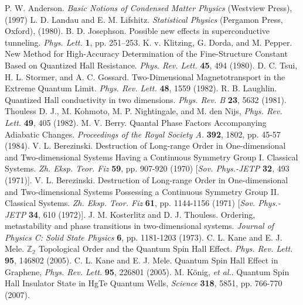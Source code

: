 \documentclass[titlepage,a4paper]{book}
\begin{document}
\begin{thebibliography}{199}
P. W. Anderson. \textit{Basic Notions of Condensed Matter Physics} (Westview Press), (1997)
L. D. Landau and E. M. Lifshitz. \textit{Statistical Physics} (Pergamon Press, Oxford), (1980).
B. D. Josephson. Possible new effects in superconductive tunneling. \textit{Phys. Lett.} \textbf{1}, pp. 251–253. 
K. v. Klitzing, G. Dorda, and M. Pepper. New Method for High-Accuracy Determination of the Fine-Structure Constant Based on Quantized Hall Resistance. \textit{Phys. Rev. Lett.} \textbf{45}, 494 (1980).
D. C. Tsui, H. L. Stormer, and A. C. Gossard. Two-Dimensional Magnetotransport in the Extreme Quantum Limit. \textit{Phys. Rev. Lett.} \textbf{48}, 1559 (1982).
R. B. Laughlin. Quantized Hall conductivity in two dimensions. \textit{Phys. Rev. B} \textbf{23}, 5632 (1981).
Thouless D. J., M. Kohmoto, M. P. Nightingale, and M. den Nijs, \textit{Phys. Rev. Lett.} \textbf{49}, 405 (1982).
M. V. Berry. Quantal Phase Factors Accompanying Adiabatic Changes. \textit{Proceedings of the Royal Society A.} \textbf{392}, 1802, pp. 45-57 (1984).
V. L. Berezinski. Destruction of Long-range Order in One-dimensional and Two-dimensional Systems Having a Continuous Symmetry Group I. Classical Systems. \textit{Zh. Eksp. Teor. Fiz} \textbf{59}, pp. 907-920 (1970) [\textit{Sov. Phys.-JETP} \textbf{32}, 493 (1971)].
V. L. Berezinski. Destruction of Long-range Order in One-dimensional and Two-dimensional Systems Possessing a Continuous Symmetry Group II. Classical Systems. \textit{Zh. Eksp. Teor. Fiz} \textbf{61}, pp. 1144-1156 (1971) [\textit{Sov. Phys.-JETP} \textbf{34}, 610 (1972)].
J. M. Kosterlitz and D. J. Thouless. Ordering, metastability and phase transitions in two-dimensional systems. \textit{Journal of Physics C: Solid State Physics} \textbf{6}, pp. 1181-1203 (1973).
C. L. Kane and E. J. Mele. $\mathbb{Z_2}$ Topological Order and the Quantum Spin Hall Effect. \textit{Phys. Rev. Lett.} \textbf{95}, 146802 (2005).
C. L. Kane and E. J. Mele. Quantum Spin Hall Effect in Graphene, \textit{Phys. Rev. Lett.} \textbf{95}, 226801 (2005).
M. König, \textit{et al.}. Quantum Spin Hall Insulator State in HgTe Quantum Wells, \textit{Science} \textbf{318}, 5851, pp. 766-770 (2007).

\end{thebibliography}
\end{document}
